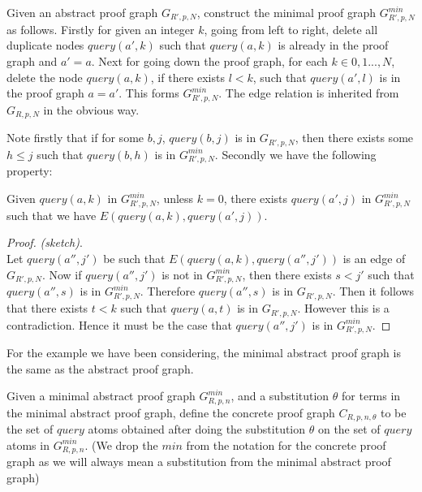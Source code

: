\begin{definition}\label{minabsgraph}
Given an abstract proof graph $G_{R',p,N}$, construct the minimal proof graph $G_{R',p,N}^{min}$ as follows. Firstly for given an integer $k$, going from left to right, delete all duplicate nodes $query(a',k)$ such that $query(a,k)$ is already in the proof graph and $a'=a$. Next for going down the proof graph, for each $k\in {0,1...,N}$, delete the node $query(a,k)$, if there exists $l<k$, such that $query(a',l)$ is in the proof graph $a=a'$. This forms $G_{R',p,N}^{min}$. The edge relation is inherited from $G_{R,p,N}$ in the obvious way. 
\end{definition}
Note firstly that if for some $b,j$, $query(b,j)$ is in $G_{R',p,N}$, then there exists some $h\leq j$ such that $query(b,h)$ is in $G_{R',p,N}^{min}$. Secondly we have the following property:
\begin{lemma}
Given $query(a,k)$ in $G_{R',p,N}^{min}$, unless $k=0$, there exists $query(a',j)$ in $G_{R',p,N}^{min}$ such that we have $E(query(a,k),query(a',j))$.  
\end{lemma}


\begin{proof} \textit{(sketch)}. \\
Let $query(a'',j')$ be such that $E(query(a,k),query(a'',j'))$ is an edge of $G_{R',p,N}$. Now if $query(a'',j')$ is not in $G_{R',p,N}^{min}$, then there exists $s<j'$ such that $query(a'',s)$ is in $G_{R',p,N}^{min}$. Therefore $query(a'',s)$ is in $G_{R',p,N}$. Then it follows that there exists $t<k$ such that $query(a,t)$ is in $G_{R',p,N}$. However this is a contradiction. Hence it must be the case that $query(a'',j')$ is in $G_{R',p,N}^{min}$. 
\end{proof}

For the example we have been considering, the minimal abstract proof graph is the same as the abstract proof graph.

\begin{definition}\label{def:concretegraph}
Given a minimal abstract proof graph $G_{R,p,n}^{min}$, and a substitution $\theta$ for
terms in the minimal abstract proof graph, define the concrete proof graph
$C_{R,p,n,\theta}$ to be the set of $query$ atoms obtained after doing the
substitution $\theta$ on the set of $query$ atoms in $G_{R,p,n}^{min}$. (We drop the $min$ from the notation for the concrete proof graph as we will always mean a substitution from the minimal abstract proof graph)
\end{definition}

